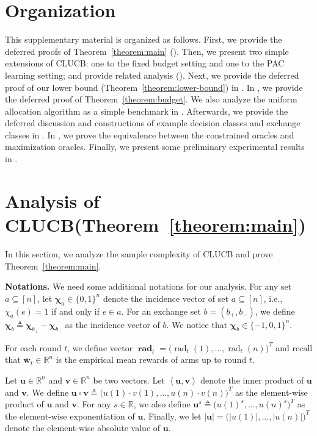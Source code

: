 \documentclass{article}
\newcommand{\Algorithm}{{\small \textsf{CLUCB}}\xspace}
\newcommand{\RR}{\mathbb R}
\DeclareMathOperator{\rad}{rad}
\newcommand{\inn}[1]{\left\langle #1 \right\rangle}
\renewcommand{\vec}[1]{\boldsymbol{#1}}
\renewcommand{\odot}{\circ}
\begin{document}
\maketitle

\section*{Organization}
This supplementary material is organized as follows.
First, we provide the deferred proofs of Theorem~\ref{theorem:main} ().
Then, we present two simple extensions of \Algorithm: one to the fixed budget setting and one to the PAC learning setting; and provide related analysis ().
Next, we provide the deferred proof of our lower bound (Theorem~\ref{theorem:lower-bound}) in .
In , we provide the deferred proof of Theorem~\ref{theorem:budget}.
We also analyze the uniform allocation algorithm as a simple benchmark in .
Afterwards, we provide the deferred discussion and constructions of example decision classes and exchange classes in . 
In , we prove the equivalence between the constrained oracles and maximization oracles.
Finally, we present some preliminary experimental results in .


\section{Analysis of \Algorithm (Theorem~\ref{theorem:main})}
\label{section:proof-algorithm}

In this section, we analyze the sample complexity of \Algorithm and prove Theorem~\ref{theorem:main}.

\textbf{Notations.} 
We need some additional notations for our analysis.
For any set $a\subseteq [n]$, let $\vec \chi_a \in \{0,1\}^n$ denote the incidence vector of set $a \subseteq [n]$, i.e., $\chi_a(e) = 1$ if and only if $e\in a$.
For an exchange set $b=(b_+,b_-)$, we define $\vec \chi_b \triangleq \vec \chi_{b_+}- \vec \chi_{b_-}$ as the incidence vector of $b$.
We notice that $\vec \chi_b \in \{-1,0,1\}^n$.

For each round $t$, we define vector $\vec\rad_t = \big(\rad_t(1),\ldots,\rad_t(n)\big)^T$ and recall that $\vec {\bar w}_t\in \RR^n$ is the empirical mean rewards of arms up to round $t$.

Let $\vec u\in \RR^n$ and $\vec v\in \RR^n$ be two vectors.
Let $\inn{\vec u, \vec v}$ denote the inner product of $\vec u$ and $\vec v$.
We define $\vec u \odot \vec v \triangleq \big(u(1)\cdot v(1),\ldots,u(n)\cdot v(n)\big)^T$ as the element-wise product of $\vec u$ and $\vec v$.
For any $s\in \RR$, we also define $\vec u^s \triangleq \big(u(1)^s, \ldots, u(n)^s)^T$ as the element-wise exponentiation of $\vec u$.
Finally, we let $|\vec u| = \big(|u(1)|, \ldots, |u(n)|\big)^T$ denote the element-wise absolute value of $\vec u$.
\end{document}
